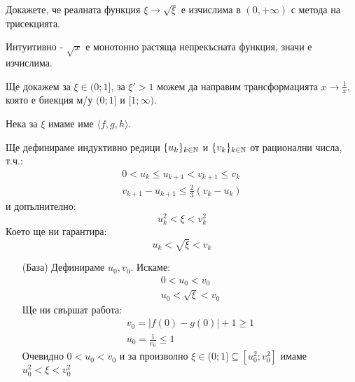 \begin{problem}
Докажете, че реалната функция $\xi \to \sqrt{\xi}$ е изчислима в $(0, +\infty)$ с метода на трисекцията.
\end{problem}
\begin{solution}
    Интуитивно - $\sqrt{x}$ е монотонно растяща непрекъсната функция, значи е изчислима.

    Ще докажем за $\xi \in (0; 1]$, за $\xi' > 1$ можем да направим трансформацията $x \to \frac{1}{x}$, която е биекция м/у $(0;1]$ и $[1; \infty)$.

    Нека за $\xi$ имаме име $\langle f, g, h \rangle$.

    Ще дефинираме индуктивно редици $\{u_k\}_{k \in {\mathbb{N}}}$ и $\{v_k\}_{k \in {\mathbb{N}}}$ от рационални числа, т.ч.:
    \begin{equation}
        \begin{split}
            0 < u_k \leq u_{k+1} < v_{k+1} \leq v_k \\
            v_{k+1} - u_{k+1} \leq \frac{2}{3}(v_k - u_k)
        \end{split}
    \end{equation}
    и допълнително:
    \begin{equation}
        u_k^2 < \xi < v_k^2
    \end{equation}
    Което ще ни гарантира:
    \begin{equation}
        u_k < \sqrt{\xi} < v_k
    \end{equation}
    \begin{itemize}
        \item[(База)] Дефинираме $u_0, v_0$. Искаме:
            \begin{equation}
                \begin{split}
                    0 < u_0 < v_0 \\
                    u_0 < \sqrt{\xi} < v_0
                \end{split}
            \end{equation}
            Ще ни свършат работа:
            \begin{equation}
                \begin{split}
                    v_0 = |f(0) - g(0)| + 1 \geq 1 \\
                    u_0 = \frac{1}{v_0} \leq 1
                \end{split}
            \end{equation}
            Очевидно $0 < u_0 < v_0$ и за произволно $\xi \in (0; 1] \subseteq [u_0^2;v_0^2]$ имаме $u_0^2 < \xi < v_0^2$

\end{itemize}
\end{solution}

